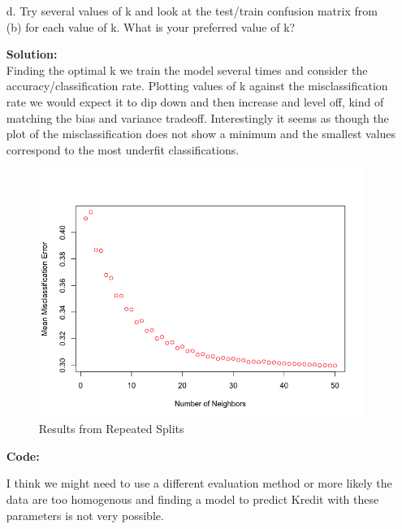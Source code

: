 \documentclass[12pt]{article}
\makeatletter
\theoremstyle{homework}
\newenvironment{exercise}[1]
{\def\@currentlabel{#1}\exercisecore}
{\endexercisecore}
\newcommand{\localhead}[1]{\par\smallskip\noindent\textbf{#1}\nobreak\\}%
\newcommand\solution{\localhead{Solution:}}
\makeatother
\begin{document}
\begin{exercise}{1}
\begin{enumerate}
    \item[d.] Try several values of k and look at the test/train confusion matrix from (b) for each value of k. What is your preferred value of k?\\
    \solution Finding the optimal k we train the model several times and consider the accuracy/classification rate. Plotting values of k against the misclassification rate we would expect it to dip down 
    and then increase and level off, kind of matching the bias and variance tradeoff. Interestingly it seems as though the plot of the misclassification does not show a minimum and the smallest values correspond to the most underfit classifications. 
      \begin{figure}[H]
        \begin{center}
          \caption{Results from Repeated Splits}
        \includegraphics[width = \textwidth]{Rplot02.png}
        \end{center}
      \end{figure}
      \textbf{Code:}
      \begin{center}
      
      \end{center}
      I think we might need to use a different evaluation method or more likely the data are too homogenous and finding a model to predict Kredit with these parameters is not very possible.
  \end{enumerate}
\end{exercise}
\vspace{.5in}
\end{document}
